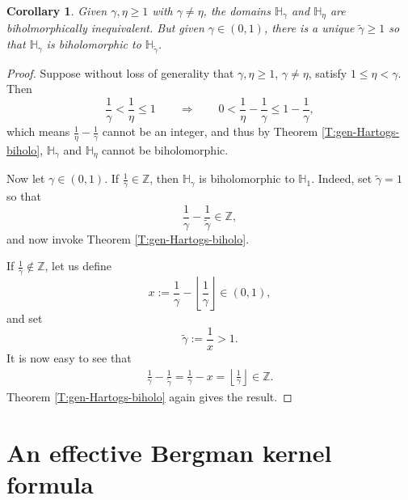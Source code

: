 \documentclass[letterpaper,11pt,reqno]{amsart}
\theoremstyle{plain}
\newtheorem{corollary}[equation]{Corollary}
\theoremstyle{definition}
\theoremstyle{remark}
\theoremstyle{remark}
\numberwithin{equation}{section}
\newcommand{\wt}{\widetilde}
\newcommand{\h}{{\mathbb H}}
\newcommand{\Z}{{\mathbb Z}}
\begin{document}
\begin{corollary}\label{C:biholo-equiv-classes}
Given $\gamma, \eta \ge 1$ with $\gamma \neq \eta$, the domains $\h_\gamma$ and $\h_\eta$ are biholmorphically inequivalent.
But given $\gamma \in (0,1)$, there is a unique $\wt{\gamma} \ge 1$ so that $\h_\gamma$ is biholomorphic to $\h_{\wt\gamma}$.
\end{corollary}
\begin{proof}
Suppose without loss of generality that $\gamma,\eta \ge 1$, $\gamma \neq \eta$, satisfy 
$1\le\eta<\gamma$. 
Then
\begin{equation}
\frac{1}{\gamma} < \frac{1}{\eta} \le 1 \qquad \Longrightarrow \qquad 0 < \frac{1}{\eta} - \frac{1}{\gamma} \le 1 - \frac{1}{\gamma},
\end{equation}
which means $\frac{1}{\eta} - \frac{1}{\gamma}$ cannot be an integer, and thus by Theorem \ref{T:gen-Hartogs-biholo}, $\h_\gamma$ and $\h_\eta$ cannot be biholomorphic.

Now let $\gamma \in (0,1)$. 
If $\frac{1}{\gamma} \in \Z$, then $\h_\gamma$ is biholomorphic to $\h_1$. 
Indeed, set $\wt\gamma = 1$ so that
\begin{equation*}
\frac{1}{\gamma} - \frac{1}{\wt\gamma} \in \Z,
\end{equation*}
and now invoke  Theorem \ref{T:gen-Hartogs-biholo}.

If $\frac{1}{\gamma} \notin \Z$, let us define 
\begin{equation}
x := \frac{1}{\gamma} - \left\lfloor \frac{1}{\gamma} \right\rfloor \in (0,1),
\end{equation}
and set 
\begin{equation}
\wt\gamma := \frac{1}{x} > 1.
\end{equation}
It is now easy to see that
\begin{align}
\frac{1}{\gamma} - \frac{1}{\wt\gamma} = \frac{1}{\gamma} - x = \left\lfloor \frac{1}{\gamma} \right\rfloor \in \Z.
\end{align}
Theorem \ref{T:gen-Hartogs-biholo} again gives the result.
\end{proof}



\section{An effective Bergman kernel formula}\label{S:effective-formula}
\end{document}
